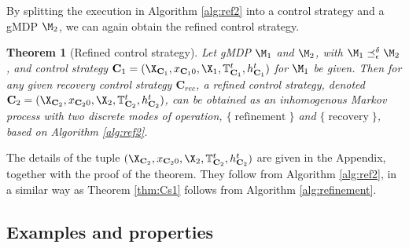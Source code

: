 \documentclass[letterpaper, 10 pt, conference]{amsart}
\newtheorem{thm}[theorem]{Theorem}
\theoremstyle{definition}
\theoremstyle{example}
\theoremstyle{remark}
\newcommand{\eps}{\epsilon}
\newcommand{\C}{{\mathbf{C}}}
\begin{document}
By splitting the execution in Algorithm \ref{alg:ref2} into a control strategy and a gMDP $\M_2$, we can again obtain the refined control strategy. 
\begin{thm}[Refined control strategy]\label{thm:Apprxstrat}
Let gMDP $\M_1$ and $\M_2$, with $\M_1\preceq_\eps^\delta\M_2$, and control strategy $\C_1=(\X_{\C_1},x_{\C_10},\X_1,\mathbb T_{\C_1}^t,h_{\C_1}^t)$ for $ \M_1$ be given. 
Then for any given recovery control strategy $\C_{rec}$, 
a refined control strategy, denoted $\C_2=(\X_{\C_2},x_{\C_20},\X_2,\mathbb T_{\C_2}^t,h_{\C_2}^t)$, can be obtained as an \emph{inhomogenous Markov process} with two discrete modes of operation,  
$\{\operatorname{refinement}\}$ and $\{\operatorname{recovery}\}$, based on Algorithm \ref{alg:ref2}. 
\end{thm}
The details of the tuple $(\X_{\C_2},x_{\C_20},\X_2,\mathbb T_{\C_2}^t,h_{\C_2}^t)$ are given in the Appendix,  
 together with the proof of the theorem. 
They follow from Algorithm \ref{alg:ref2}, in a similar way as Theorem \ref{thm:Cs1} follows from Algorithm \ref{alg:refinement}. \medskip
 
\subsection{Examples and properties}
\end{document}
